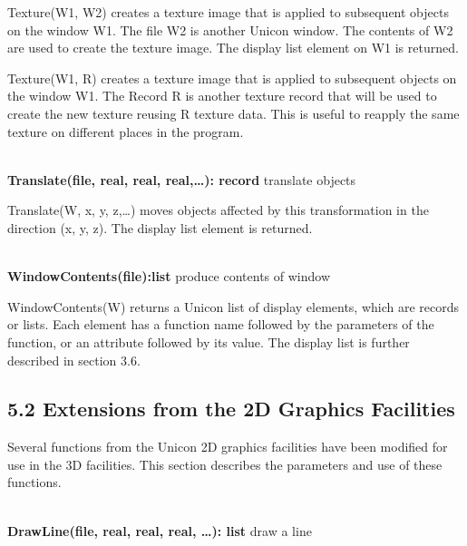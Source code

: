 \documentclass[letterpaper]{article}
\begin{document}
{
\textsf{Texture(W1, W2) }creates a texture image that is applied to subsequent objects on the window \textsf{W1}. The
file \textsf{W2} is another Unicon window. The contents of \textsf{W2} are used to create the texture image. The
display list element on \textsf{W1} is returned. }

{
\textsf{Texture(W1, R) }creates a texture image that is applied to subsequent objects on the window \textsf{W1}. The
Record \textsf{R} is another texture record that will be used to create the new texture reusing R texture data. This is
useful to reapply the same texture on different places in the program.}

\noindent\hrulefill\\
\noindent\textsf{\textbf{Translate(file, real, real, real,{\dots}): record}}
\hfill translate objects


\bigskip

{
\textsf{Translate(W, x, y, z,{\dots})} moves objects affected by this transformation in the direction (x, y, z). The
display list element is returned.}

\noindent\hrulefill\\
\noindent\textsf{\textbf{WindowContents(file):list}}
\hfill produce contents of window


\bigskip

{
\textsf{WindowContents(W)} returns a Unicon list of display elements, which are records or lists. Each element has a
function name followed by the parameters of the function, or an attribute followed by its value. The display list is
further described in section 3.6. }


\bigskip


\bigskip

\subsection[5.2 Extensions from the 2D Graphics Facilities]
{5.2 Extensions from the 2D Graphics Facilities}


\bigskip

{
Several functions from the Unicon 2D graphics facilities have been modified for use in the 3D facilities. This section
describes the parameters and use of these functions.}


\bigskip


\bigskip

\noindent\hrulefill\\
\noindent\textsf{\textbf{DrawLine(file, real, real, real, {\dots}): list}}
\hfill draw a line
\end{document}
